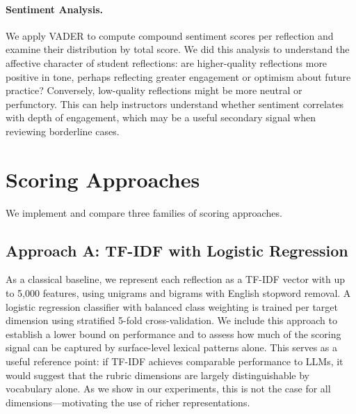 \documentclass[11pt]{article}
\begin{document}
\paragraph{Sentiment Analysis.} We apply VADER \citep{hutto2014vader} to compute compound sentiment scores per reflection and examine their distribution by total score. We did this analysis to understand the affective character of student reflections: are higher-quality reflections more positive in tone, perhaps reflecting greater engagement or optimism about future practice? Conversely, low-quality reflections might be more neutral or perfunctory. This can help instructors understand whether sentiment correlates with depth of engagement, which may be a useful secondary signal when reviewing borderline cases.





\section{Scoring Approaches}

We implement and compare three families of scoring approaches.

\subsection{Approach A: TF-IDF with Logistic Regression}

As a classical baseline, we represent each reflection as a TF-IDF vector with up to 5{,}000 features, using unigrams and bigrams with English stopword removal. A logistic regression classifier with balanced class weighting is trained per target dimension using stratified 5-fold cross-validation. We include this approach to establish a lower bound on performance and to assess how much of the scoring signal can be captured by surface-level lexical patterns alone. This serves as a useful reference point: if TF-IDF achieves comparable performance to LLMs, it would suggest that the rubric dimensions are largely distinguishable by vocabulary alone. As we show in our experiments, this is not the case for all dimensions—motivating the use of richer representations.
\end{document}
